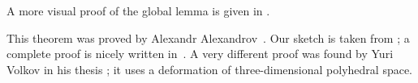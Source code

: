 A more visual proof of the global lemma is given in \cite[II \S 1.3]{alexandrov}.

This theorem was proved by Alexandr Alexandrov~\cite{alexandrov-1941}.
Our sketch is taken from \cite{lebedeva-petrunin};
a complete proof is nicely written in~\cite{alexandrov}.
A very different proof was found by Yuri Volkov in his thesis \cite{volkov};
it uses a deformation of three-dimensional polyhedral space.
